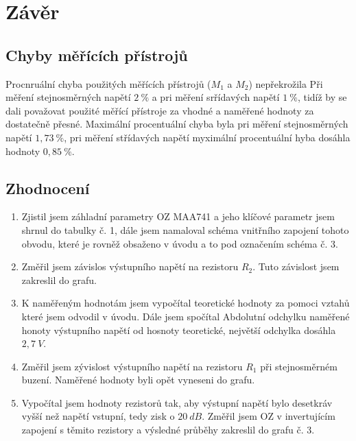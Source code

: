 \section{Závěr}
  
  
  \subsection{Chyby měřících přístrojů}
    \indent\indent
    Procnruální chyba použitých měřících přístrojů ($M_1$ a $M_2$) nepřekrožila Při měření stejnosměrných napětí $2~\%$ a pri měření srřídavých napětí $1~\%$, tidíž by se dali považovat použité měřící přístroje za vhodné a naměřené hodnoty za dostatečně přesné. Maximální procentuální chyba byla pri měření stejnosměrných napětí $1,73~\%$, pri měření střídavých napětí myximální procentuální hyba dosáhla hodnoty $0,85~\%$.
  
  \subsection{Zhodnocení}
    \begin{enumerate}
      \item
        Zjistil jsem záhladní parametry OZ MAA741 a jeho klíčové parametr jsem shrnul do tabulky č. 1, dále jsem namaloval schéma vnitřního zapojení tohoto obvodu, které je rovněž obsaženo v úvodu a to pod označením schéma č. 3.
      \item
        Změřil jsem závislos výstupního napětí na rezistoru $R_2$. Tuto závislost jsem zakreslil do grafu.
      \item
      	K naměřeným hodnotám jsem vypočítal teoretické hodnoty za pomoci vztahů které jsem odvodil v úvodu. Dále jsem spočítal Abdolutní odchylku naměřené honoty výstupního napětí od hosnoty teoretické, největší odchylka dosáhla $2,7~V$.
      \item
        Změřil jsem zývislost výstupního napětí na rezistoru $R_1$ při stejnosměrném buzení. Naměřené hodnoty byli opět vyneseni do grafu.
      \item
        Vypočítal jsem hodnoty rezistorů tak, aby výstupní napětí bylo desetkráv vyšší než napětí vstupní, tedy zisk o $20~dB$. Změřil jsem OZ v invertujícím zapojení s těmito rezistory a výsledné průběhy zakreslil do grafu č. 3.
    \end{enumerate}
